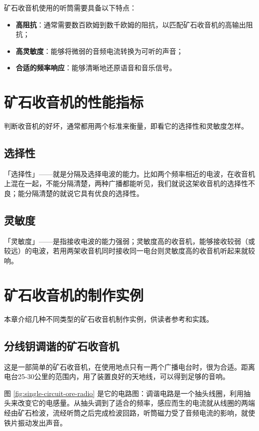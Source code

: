 \documentclass[12pt,UTF8]{ctexbook}
\begin{document}
矿石收音机使用的听筒需要具备以下特点：

\begin{itemize}
	\item \textbf{高阻抗}：通常需要数百欧姆到数千欧姆的阻抗，以匹配矿石收音机的高输出阻抗；
	\item \textbf{高灵敏度}：能够将微弱的音频电流转换为可听的声音；
	\item \textbf{合适的频率响应}：能够清晰地还原语音和音乐信号。
\end{itemize}

\chapter{矿石收音机的性能指标}

判断收音机的好坏，通常都用两个标准来衡量，即看它的选择性和灵敏度怎样。

\section{选择性}

「选择性」——就是分隔及选择电波的能力。比如两个频率相近的电波，在收音机上混在一起，不能分隔清楚，两种广播都能听见，我们就说这架收音机的选择性不良；能分隔清楚的就说它具有优良的选择性。

\section{灵敏度}

「灵敏度」——是指接收电波的能力强弱；灵敏度高的收音机，能够接收较弱（或较远）的电波，若用两架收音机同时接收同一电台则灵敏度高的收音机听起来就较响。

\chapter{矿石收音机的制作实例}

本章介绍几种不同类型的矿石收音机制作实例，供读者参考和实践。

\section{分线钥调谐的矿石收音机}

这是一部简单的矿石收音机，在使用地点只有一两个广播电台时，很为合适。距离电台25-30公里的范围内，用了装置良好的天地线，可以得到足够的音响。

图 \ref{fig:single-circuit-ore-radio} 是它的电路图：调谐电路是一个抽头线圈，利用抽头来改变它的电感量。从抽头调到了适合的频率，感应而生的电流就从线圈的两端经由矿石检波，流经听筒之后完成检波回路，听筒磁力受了音频电流的影响，就使铁片振动发出声音。
\end{document}
